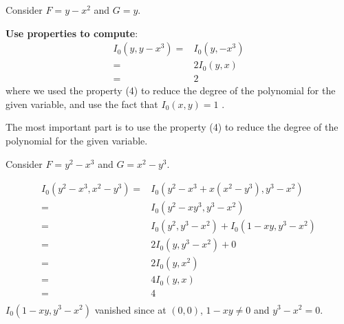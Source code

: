 \documentclass[10pt]{article}
\begin{document}
\begin{example}
  Consider $ F = y - x^{2}$ and $ G = y$.
\end{example}
\begin{solution}
  \textbf{Use properties to compute}:
  \begin{equation*}
    \begin{aligned}
      I_{0}(y, y - x^{3}) = & I_{0}(y , - x^3) \\
      = & 2 I_0 (y,x) \\
      = & 2
    \end{aligned}
  \end{equation*}
  where we used the property (4) to reduce the degree of the polynomial for the given variable, and use the fact that $ I_{0}(x,y) = 1$ .
\end{solution}
The most important part is to use the property (4) to reduce the degree of the polynomial for the given variable.
\begin{example}
  Consider $ F = y^{2} - x^{3}$ and $ G = x^{2} - y^{3}$.
\end{example}
\begin{solution}
  \begin{equation*}
    \begin{aligned}
      I_{0}(y^{2} - x^{3}, x^{2} - y^{3}) = & I_{0}(y^{2} - x^{3} + x (x^{2} - y^{3}), y^{3} - x^{2}) \\
      = & I_0(y^{2} - x y^{3}, y^{3} - x^{2}) \\
      = & I_0(y^{2}, y^{3} - x^{2}) + I_0(1 - x y, y^{3} - x^{2}) \\
      = & 2 I_0(y, y^{3} - x^{2}) + 0\\
      = & 2 I_0(y, x^{2})\\
      = & 4 I_0(y,x) \\
      = & 4\\
    \end{aligned}
  \end{equation*}
  $ I_0(1-xy, y^{3} - x^{2})$ vanished since at $ (0,0)$, $ 1 - xy \neq 0$ and $ y^{3} - x^{2} = 0$.
\end{solution}
\end{document}

